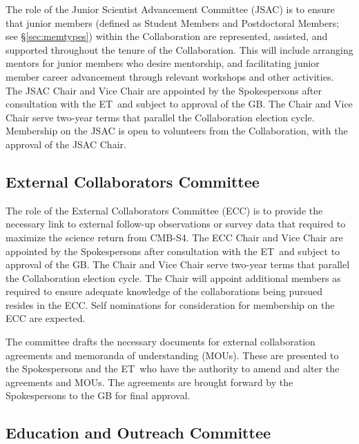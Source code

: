 \documentclass[12pt]{article}
\newcommand{\Comment}[1]{\textcolor{Blue}{(Comment: #1)}}
\newcommand{\exec}{{Executive Team}}
\newcommand{\shorte}{{ET}}  %
\newcommand\collabname{CMB-S4}
\begin{document}
The role of the Junior Scientist Advancement Committee (JSAC) is to ensure that junior members (defined as Student Members and Postdoctoral Members; see \S\ref{sec:memtypes}) within the Collaboration are represented, assisted, and supported throughout the  tenure of the Collaboration. This will include arranging mentors for junior members who desire mentorship, and facilitating junior member career advancement through relevant workshops and other activities. The JSAC Chair and Vice Chair are appointed by the \textcolor{\markcolor}{Spokespersons after consultation with the \shorte\ and subject to approval of the GB.  %
The Chair and Vice Chair} serve two-year terms that parallel the Collaboration election cycle. Membership on the JSAC is open to volunteers from the Collaboration, with the approval of the JSAC Chair. 


\subsection{External Collaborators Committee}

The role of the External Collaborators Committee (ECC) is to provide the necessary link to external follow-up observations or survey data that required to maximize the science return from \collabname. The ECC Chair and Vice Chair are appointed by the  \textcolor{\markcolor}{Spokespersons after consultation with the \shorte\ and subject to approval of the GB.  %
The Chair and Vice Chair serve two-year terms that parallel the Collaboration election cycle.} The Chair will appoint additional members as required to ensure adequate knowledge of the collaborations being pursued resides in the ECC. Self nominations for consideration for membership on the ECC are expected. 

The committee drafts the necessary documents for external collaboration agreements and memoranda of understanding (MOUs). These are presented to the Spokespersons and the \shorte\ who have the authority to amend and alter the agreements and MOUs. The agreements are brought forward by the Spokespersons to the GB for final approval. %

\subsection{Education and Outreach Committee}
\end{document}
